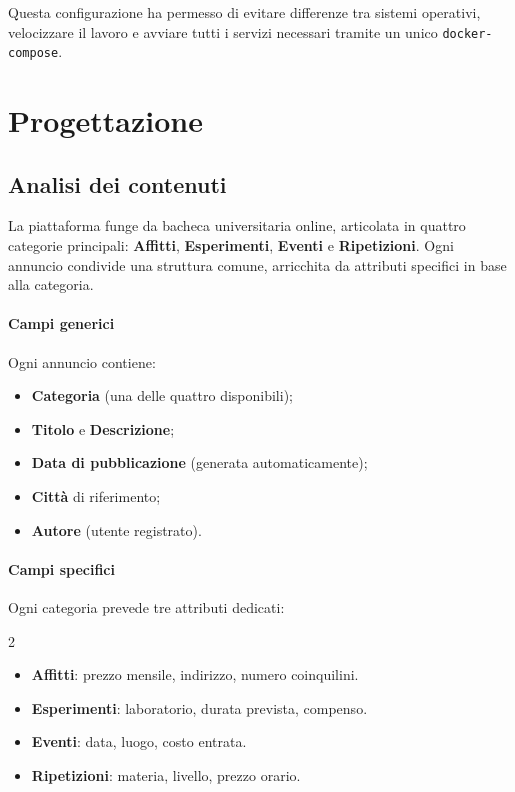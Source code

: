 \documentclass[a4paper,12pt]{article}
\begin{document}
Questa configurazione ha permesso di evitare differenze tra sistemi operativi, velocizzare il lavoro 
e avviare tutti i servizi necessari tramite un unico \texttt{docker-compose}.

\section{Progettazione}
\subsection{Analisi dei contenuti}

La piattaforma funge da bacheca universitaria online, articolata in quattro categorie principali: 
\textbf{Affitti}, \textbf{Esperimenti}, \textbf{Eventi} e \textbf{Ripetizioni}. Ogni annuncio condivide una struttura comune, 
arricchita da attributi specifici in base alla categoria.

\paragraph{Campi generici}
Ogni annuncio contiene:
\begin{itemize}
    \item \textbf{Categoria} (una delle quattro disponibili);
    \item \textbf{Titolo} e \textbf{Descrizione};
    \item \textbf{Data di pubblicazione} (generata automaticamente);
    \item \textbf{Città} di riferimento;
    \item \textbf{Autore} (utente registrato).
\end{itemize}

\paragraph{Campi specifici}
Ogni categoria prevede tre attributi dedicati:
\begin{multicols}{2}
\begin{itemize}
    \item \textbf{Affitti}: prezzo mensile, indirizzo, numero coinquilini.
    \item \textbf{Esperimenti}: laboratorio, durata prevista, compenso.
    \item \textbf{Eventi}: data, luogo, costo entrata.
    \item \textbf{Ripetizioni}: materia, livello, prezzo orario.
\end{itemize}
\end{multicols}
\end{document}
